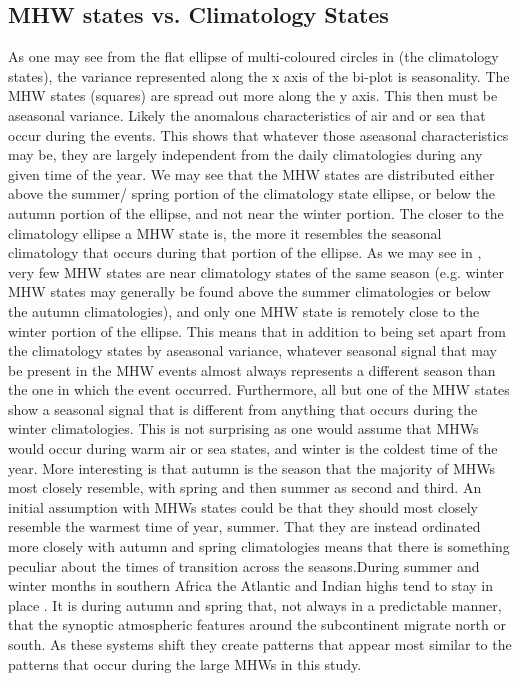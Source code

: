 \documentclass[a4paper,10pt,review]{elsarticle}
\begin{document}
\subsection{MHW states vs. Climatology States}
As one may see from the flat ellipse of multi-coloured circles in  (the climatology states), the variance represented along the x axis of the bi-plot is seasonality. The MHW states (squares) are spread out more along the y axis. This then must be aseasonal variance. Likely the anomalous characteristics of air and or sea that occur during the events. This shows that whatever those aseasonal characteristics may be, they are largely independent from the daily climatologies during any given time of the year. We may see that the MHW states are distributed either above the summer/ spring portion of the climatology state ellipse, or below the autumn portion of the ellipse, and not near the winter portion. The closer to the climatology ellipse a MHW state is, the more it resembles the seasonal climatology that occurs during that portion of the ellipse. As we may see in , very few MHW states are near climatology states of the same season (e.g. winter MHW states may generally be found above the summer climatologies or below the autumn climatologies), and only one MHW state is remotely close to the winter portion of the ellipse. This means that in addition to being set apart from the climatology states by aseasonal variance, whatever seasonal signal that may be present in the MHW events almost always represents a different season than the one in which the event occurred. Furthermore, all but one of the MHW states show a seasonal signal that is different from anything that occurs during the winter climatologies. This is not surprising as one would assume that MHWs would occur during warm air or sea states, and winter is the coldest time of the year. More interesting is that autumn is the season that the majority of MHWs most closely resemble, with spring and then summer as second and third. An initial assumption with MHWs states could be that they should most closely resemble the warmest time of year, summer. That they are instead ordinated more closely with autumn and spring climatologies means that there is something peculiar about the times of transition across the seasons.During summer and winter months in southern Africa the Atlantic and Indian highs tend to stay in place \citep{vanHeerden1998}. It is during autumn and spring that, not always in a predictable manner, that the synoptic atmospheric features around the subcontinent migrate north or south. As these systems shift they create patterns that appear most similar to the patterns that occur during the large MHWs in this study.
\end{document}
